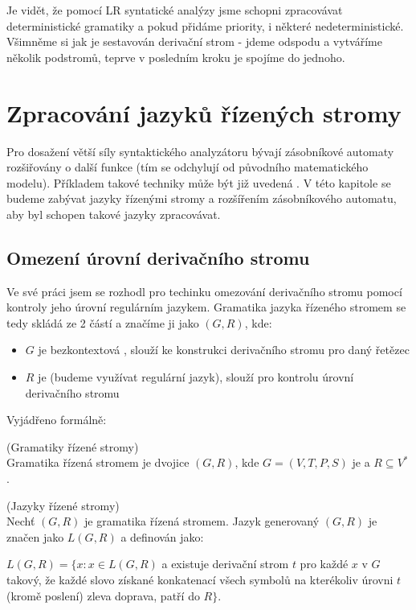Je vidět, že pomocí LR syntatické analýzy jsme schopni zpracovávat deterministické
gramatiky a pokud přidáme priority, i některé nedeterministické. Všimněme si jak je
sestavován derivační strom - jdeme odspodu a vytváříme několik podstromů,
teprve v posledním kroku je spojíme do jednoho.


\chapter{Zpracování jazyků řízených stromy}
\label{chap:TreeLangs}

Pro dosažení větší síly syntaktického analyzátoru bývají zásobníkové automaty
rozšiřovány o další funkce (tím se odchylují od původního matematického modelu).
Příkladem takové techniky může být již uvedená .
V této kapitole se budeme zabývat jazyky řízenými stromy a rozšířením
zásobníkového automatu, aby byl schopen takové jazyky zpracovávat.\\

\section{Omezení úrovní derivačního stromu}

Ve své práci jsem se rozhodl pro techinku omezování derivačního stromu pomocí
kontroly jeho úrovní regulárním jazykem.
Gramatika jazyka řízeného stromem se tedy skládá ze 2 částí a značíme ji jako
$(G, R)$, kde:
\begin{itemize}
  \item $G$ je bezkontextová , slouží ke konstrukci derivačního stromu
  pro daný řetězec
  \item $R$ je  (budeme využívat regulární jazyk),
  slouží pro kontrolu úrovní derivačního stromu
\end{itemize}

\noindent
Vyjádřeno formálně:

\begin{defn}
  (Gramatiky řízené stromy)\\
  Gramatika řízená stromem je dvojice $(G, R)$, kde $G = (V, T, P, S)$
  je  a $R \subseteq V^*$ .
\end{defn}

\begin{defn}
  \label{defn:treeControlledLanguages}
  (Jazyky řízené stromy)\\
  Nechť $(G, R)$ je gramatika řízená stromem.
  Jazyk generovaný $(G, R)$ je značen jako $L(G, R)$ a definován jako:
  \vspace{5pt}
  \begin{adjustwidth}{0.5cm}{0.5cm}
    $L(G, R) = \{x: x \in L(G, R)$ a existuje derivační strom $t$ pro
    každé $x$ v $G$ takový, že každé slovo získané konkatenací
    všech symbolů na kterékoliv úrovni $t$ (kromě poslení) zleva doprava,
    patří do $R \}$.
  \end{adjustwidth}
\end{defn}

